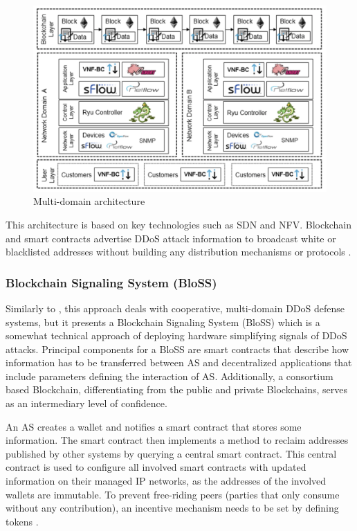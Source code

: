 \begin{figure}[ht]
  \begin{center}
    \includegraphics[scale=0.5]{Talk7/img/ddos/multi_domain}
  \end{center}
  \caption{Multi-domain architecture}
  \label{ddos_multi_domain_architecture}
\end{figure}

This architecture is based on key technologies such as SDN and NFV. Blockchain and smart contracts advertise DDoS attack information to broadcast white or blacklisted addresses without building any distribution mechanisms or protocols \cite{Rodrigues2017}.

\subsubsection{Blockchain Signaling System (BloSS)}

Similarly to \cite{Rodrigues2017}, this approach deals with cooperative, multi-domain DDoS defense systems, but it presents a Blockchain Signaling System (BloSS) which is a somewhat technical approach of deploying hardware simplifying signals of DDoS attacks. Principal components for a BloSS are smart contracts that describe how information has to be transferred between AS and decentralized applications that include parameters defining the interaction of AS. Additionally, a consortium based Blockchain, differentiating from the public and private Blockchains, serves as an intermediary level of confidence.

An AS creates a wallet and notifies a smart contract that stores some information. The smart contract then implements a method to reclaim addresses published by other systems by querying a central smart contract. This central contract is used to configure all involved smart contracts with updated information on their managed IP networks, as the addresses of the involved wallets are immutable. To prevent free-riding peers (parties that only consume without any contribution), an incentive mechanism needs to be set by defining tokens \cite{Rodrigues2019}.
